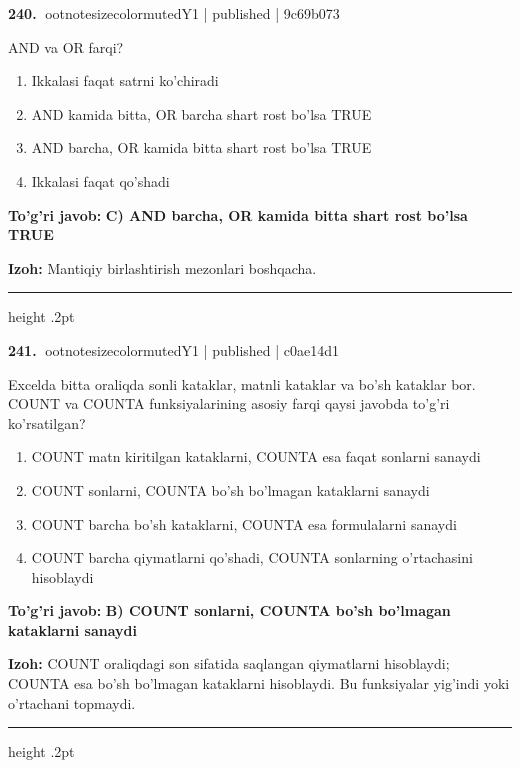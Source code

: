 \documentclass[10pt,a4paper]{article}
\begin{document}
\textbf{\color{ink}240.} {ootnotesizecolor{muted}Y1 | published | 9c69b073}
\par
AND va OR farqi?
\begin{enumerate}[label=\Alph*),leftmargin=9mm]
\item Ikkalasi faqat satrni ko'chiradi
\item AND kamida bitta, OR barcha shart rost bo'lsa TRUE
\item AND barcha, OR kamida bitta shart rost bo'lsa TRUE
\item Ikkalasi faqat qo'shadi
\end{enumerate}
\begin{tcolorbox}[enhanced,breakable,colback=teal!4,colframe=teal!55!black,boxrule=0.45pt,arc=1.2mm,left=2.8mm,right=2.8mm,top=2mm,bottom=2mm]
\textbf{\color{teal}To'g'ri javob:} \textbf{C) AND barcha, OR kamida bitta shart rost bo'lsa TRUE}
\par\smallskip
\textbf{Izoh:} Mantiqiy birlashtirish mezonlari boshqacha.
\end{tcolorbox}
\vspace{2mm}\hrule height .2pt\vspace{2mm}

\textbf{\color{ink}241.} {ootnotesizecolor{muted}Y1 | published | c0ae14d1}
\par
Excelda bitta oraliqda sonli kataklar, matnli kataklar va bo'sh kataklar bor. COUNT va COUNTA funksiyalarining asosiy farqi qaysi javobda to'g'ri ko'rsatilgan?
\begin{enumerate}[label=\Alph*),leftmargin=9mm]
\item COUNT matn kiritilgan kataklarni, COUNTA esa faqat sonlarni sanaydi
\item COUNT sonlarni, COUNTA bo'sh bo'lmagan kataklarni sanaydi
\item COUNT barcha bo'sh kataklarni, COUNTA esa formulalarni sanaydi
\item COUNT barcha qiymatlarni qo'shadi, COUNTA sonlarning o'rtachasini hisoblaydi
\end{enumerate}
\begin{tcolorbox}[enhanced,breakable,colback=teal!4,colframe=teal!55!black,boxrule=0.45pt,arc=1.2mm,left=2.8mm,right=2.8mm,top=2mm,bottom=2mm]
\textbf{\color{teal}To'g'ri javob:} \textbf{B) COUNT sonlarni, COUNTA bo'sh bo'lmagan kataklarni sanaydi}
\par\smallskip
\textbf{Izoh:} COUNT oraliqdagi son sifatida saqlangan qiymatlarni hisoblaydi; COUNTA esa bo'sh bo'lmagan kataklarni hisoblaydi. Bu funksiyalar yig'indi yoki o'rtachani topmaydi.
\end{tcolorbox}
\vspace{2mm}\hrule height .2pt\vspace{2mm}
\end{document}
